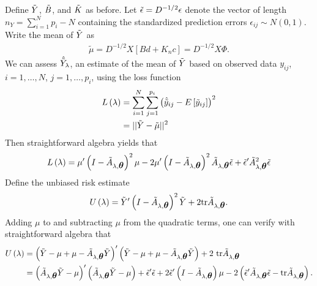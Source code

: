 Define  $\tilde{Y}$, $\tilde{B}$, and $\tilde{K}$ as before. Let $\tilde{\epsilon} = D^{-1/2} \epsilon$ denote the vector of length $n_Y = \sum_{i = 1}^N p_i - N$ containing the standardized prediction errors $\epsilon_{ij} \sim N\left(0,1\right)$. Write the mean of $\tilde{Y}$ as
\begin{align}
\tilde{\mu} = D^{-1/2} X \left[ Bd + K_nc \right] = D^{-1/2} X \Phi.
\end{align}
\noindent
We can assess $\hat{\tilde{Y}}_\lambda$, an estimate of the mean of $\tilde{Y}$ based on observed data $y_{ij}$, $i = 1,\dots, N$, $j = 1,\dots, p_i$, using the loss function
\begin{align}
\begin{split}
L\left(\lambda\right) &= \sum_{i = 1}^N \sum_{j = 1}^{p_i} \left(\hat{\tilde{y}}_{ij} - E\left[\tilde{y}_{ij}\right] \right)^2\\
&= \vert \vert \tilde{Y} - \tilde{\mu} \vert \vert^2
\end{split}
\end{align}
\noindent
Then straightforward algebra yields that 
\begin{align} 
L\left(\lambda\right) = \mu'\left( I - \tilde{A}_{\lambda,\mbox{\boldmath $\theta$}} \right)^2\mu - 2\mu'\left( I - \tilde{A}_{\lambda,\mbox{\boldmath $\theta$}} \right)^2 \tilde{A}_{\lambda,\mbox{\boldmath $\theta$}} \tilde{\epsilon} + \tilde{\epsilon}' \tilde{A}_{\lambda,\mbox{\boldmath $\theta$}}^2 \tilde{\epsilon}
\end{align}
Define the unbiased risk estimate
\begin{equation*} 
U\left(\lambda\right) = \tilde{Y}'\left( I - \tilde{A}_{\lambda,\mbox{\boldmath $\theta$}} \right)^2\tilde{Y} + {2}\mbox{tr}\tilde{A}_{\lambda,\mbox{\boldmath $\theta$}}.
\end{equation*}
 \noindent
Adding $\mu$ to and subtracting $\mu$ from the quadratic terms, one can verify with straightforward algebra that
\begin{align*}
U\left(\lambda\right) &= \left( \tilde{Y} - \mu + \mu - \tilde{A}_{\lambda,\mbox{\boldmath $\theta$}} \tilde{Y} \right)'\left( \tilde{Y} - \mu + \mu - \tilde{A}_{\lambda,\mbox{\boldmath $\theta$}} \tilde{Y} \right) + 2\mbox{ tr}\tilde{A}_{\lambda,\mbox{\boldmath $\theta$}} \\
&= \left(\tilde{A}_{\lambda,\mbox{\boldmath $\theta$}} \tilde{Y} - \mu \right)'\left( \tilde{A}_{\lambda,\mbox{\boldmath $\theta$}} \tilde{Y} - \mu \right) + \tilde{\epsilon}'\tilde{\epsilon} + 2\tilde{\epsilon}' \left( I- \tilde{A}_{\lambda,\mbox{\boldmath $\theta$}}\right)\mu- 2\left( \tilde{\epsilon}'\tilde{A}_{\lambda,\mbox{\boldmath $\theta$}} \tilde{\epsilon} -  \mbox{tr}\tilde{A}_{\lambda,\mbox{\boldmath $\theta$}}\right).
\end{align*}
